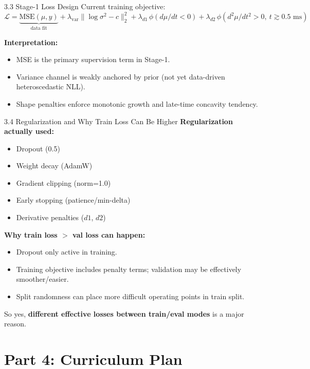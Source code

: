 \documentclass[UTF8,aspectratio=169]{ctexbeamer}
\begin{document}
\begin{frame}{3.3 Stage-1 Loss Design}
Current training objective:
\[
\mathcal{L} =
\underbrace{\mathrm{MSE}(\mu,y)}_{\text{data fit}}
 + \lambda_{\mathrm{var}}\|\log\sigma^2 - c\|_2^2
 + \lambda_{d1}\,\phi(d\mu/dt<0)
 + \lambda_{d2}\,\phi(d^2\mu/dt^2>0,\ t\gtrsim 0.5\text{ ms})
\]

\vspace{0.3em}
\textbf{Interpretation:}
\begin{itemize}
  \item MSE is the primary supervision term in Stage-1.
  \item Variance channel is weakly anchored by prior (not yet data-driven heteroscedastic NLL).
  \item Shape penalties enforce monotonic growth and late-time concavity tendency.
\end{itemize}
\end{frame}

\begin{frame}{3.4 Regularization and Why Train Loss Can Be Higher}
\textbf{Regularization actually used:}
\begin{itemize}
  \item Dropout (0.5)
  \item Weight decay (AdamW)
  \item Gradient clipping (norm=1.0)
  \item Early stopping (patience/min-delta)
  \item Derivative penalties ($d1$, $d2$)
\end{itemize}

\vspace{0.3em}
\textbf{Why train loss $>$ val loss can happen:}
\begin{itemize}
  \item Dropout only active in training.
  \item Training objective includes penalty terms; validation may be effectively smoother/easier.
  \item Split randomness can place more difficult operating points in train split.
\end{itemize}

\vspace{0.3em}
So yes, \textbf{different effective losses between train/eval modes} is a major reason.
\end{frame}

\section{Part 4: Curriculum Plan}
\end{document}
